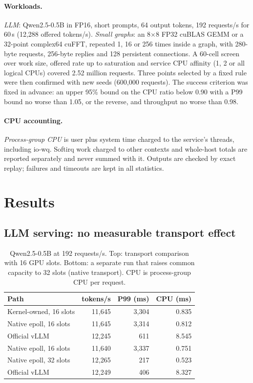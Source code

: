 \documentclass[sigconf,nonacm]{acmart}
\begin{document}
\paragraph{Workloads.} \emph{LLM}: Qwen2.5-0.5B in FP16, short prompts, 64
output tokens, 192 requests/s for 60\,s (12,288 offered tokens/s).
\emph{Small graphs}: an 8$\times$8 FP32 cuBLAS GEMM or a 32-point complex64
cuFFT, repeated 1, 16 or 256 times inside a graph, with 280-byte requests,
256-byte replies and 128 persistent connections. A 60-cell screen over work
size, offered rate up to saturation and service CPU affinity (1, 2 or all
logical CPUs) covered 2.52 million requests. Three points selected by a fixed
rule were then confirmed with new seeds (600,000 requests). The success
criterion was fixed in advance: an upper 95\% bound on the CPU ratio below 0.90
with a P99 bound no worse than 1.05, or the reverse, and throughput no worse
than 0.98.

\paragraph{CPU accounting.} \emph{Process-group CPU} is user plus system time
charged to the service's threads, including io-wq. Softirq work charged to
other contexts and whole-host totals are reported separately and never summed
with it. Outputs are checked by exact replay; failures and timeouts are kept in
all statistics.

\section{Results}
\label{sec:results}

\subsection{LLM serving: no measurable transport effect}

\begin{table}[t]
\centering
\small
\caption{Qwen2.5-0.5B at 192 requests/s. Top: transport comparison with 16 GPU
slots. Bottom: a separate run that raises common capacity to 32 slots
(native transport). CPU is process-group CPU per request.}
\label{tab:llm}
\begin{tabular}{lrrr}
\toprule
Path & tokens/s & P99 (ms) & CPU (ms) \\
\midrule
Kernel-owned, 16 slots & 11,645 & 3,304 & 0.835 \\
Native epoll, 16 slots & 11,645 & 3,314 & 0.812 \\
Official vLLM & 12,245 & 611 & 8.545 \\
\midrule
Native epoll, 16 slots & 11,640 & 3,337 & 0.751 \\
Native epoll, 32 slots & 12,265 & 217 & 0.523 \\
Official vLLM & 12,249 & 406 & 8.327 \\
\bottomrule
\end{tabular}
\end{table}
\end{document}
